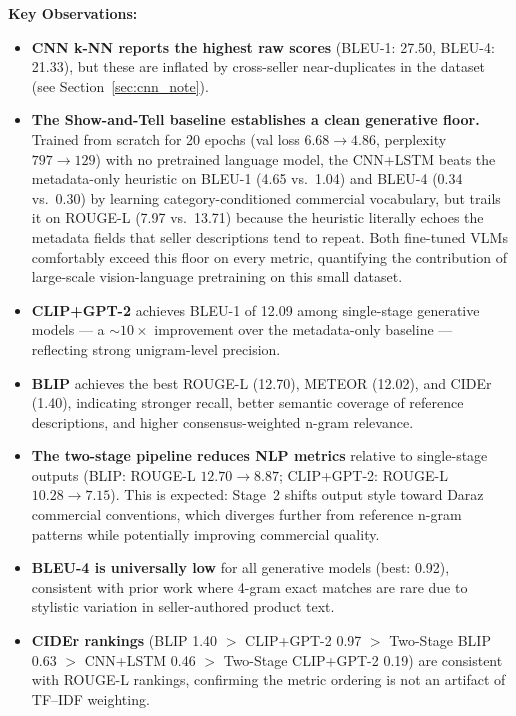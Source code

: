 \documentclass[12pt,a4paper]{article}
\begin{document}
\textbf{Key Observations:}
\begin{itemize}[noitemsep]
  \item \textbf{CNN k-NN reports the highest raw scores} (BLEU-1: 27.50, BLEU-4: 21.33),
        but these are inflated by cross-seller near-duplicates in the dataset
        (see Section~\ref{sec:cnn_note}).
  \item \textbf{The Show-and-Tell baseline establishes a clean generative floor.}
        Trained from scratch for 20 epochs (val loss $6.68 \rightarrow 4.86$,
        perplexity $797 \rightarrow 129$) with no pretrained language model, the
        CNN+LSTM beats the metadata-only heuristic on BLEU-1 (4.65 vs.\ 1.04) and
        BLEU-4 (0.34 vs.\ 0.30) by learning category-conditioned commercial
        vocabulary, but trails it on ROUGE-L (7.97 vs.\ 13.71) because the
        heuristic literally echoes the metadata fields that seller descriptions
        tend to repeat. Both fine-tuned VLMs comfortably exceed this floor on
        every metric, quantifying the contribution of large-scale vision-language
        pretraining on this small dataset.
  \item \textbf{CLIP+GPT-2} achieves BLEU-1 of 12.09 among single-stage generative
        models --- a $\sim$$10\times$ improvement over the metadata-only baseline ---
        reflecting strong unigram-level precision.
  \item \textbf{BLIP} achieves the best ROUGE-L (12.70), METEOR (12.02), and CIDEr
        (1.40), indicating stronger recall, better semantic coverage of reference
        descriptions, and higher consensus-weighted n-gram relevance.
  \item \textbf{The two-stage pipeline reduces NLP metrics} relative to single-stage
        outputs (BLIP: ROUGE-L $12.70 \rightarrow 8.87$; CLIP+GPT-2: ROUGE-L
        $10.28 \rightarrow 7.15$). This is expected: Stage~2 shifts output style
        toward Daraz commercial conventions, which diverges further from reference
        n-gram patterns while potentially improving commercial quality.
  \item \textbf{BLEU-4 is universally low} for all generative models (best: 0.92),
        consistent with prior work where 4-gram exact matches are rare due to
        stylistic variation in seller-authored product text.
  \item \textbf{CIDEr rankings} (BLIP 1.40 $>$ CLIP+GPT-2 0.97 $>$ Two-Stage BLIP
        0.63 $>$ CNN+LSTM 0.46 $>$ Two-Stage CLIP+GPT-2 0.19) are consistent with
        ROUGE-L rankings, confirming the metric ordering is not an artifact of
        TF--IDF weighting.
\end{itemize}
\end{document}

